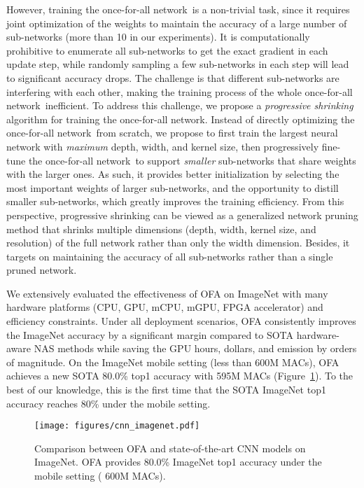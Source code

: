 \documentclass{article} \usepackage{iclr2020_conference,times}
\newcommand{\motherNet}{once-for-all network}
\begin{document}
However, training the \motherNet~is a non-trivial task, since it requires joint optimization of the weights to maintain the accuracy of a large number of sub-networks (more than 10 in our experiments). It is computationally prohibitive to enumerate all sub-networks to get the exact gradient in each update step, while randomly sampling a few sub-networks in each step will lead to significant accuracy drops. The challenge is that different sub-networks are interfering with each other, making the training process of the whole \motherNet~inefficient. 
To address this challenge, we propose a \textit{progressive shrinking} algorithm for training the \motherNet. Instead of directly optimizing the \motherNet~from scratch, we propose to first train the largest neural network with \emph{maximum} depth, width, and kernel size, then progressively fine-tune the \motherNet~to support \textit{smaller} sub-networks that share weights with the larger ones. As such, it provides better initialization by selecting the most important weights of larger sub-networks, and the opportunity to distill smaller sub-networks, which greatly improves the training efficiency. From this perspective, progressive shrinking can be viewed as a generalized network pruning method that shrinks multiple dimensions (depth, width, kernel size, and resolution) of the full network rather than only the width dimension. Besides, it targets on maintaining the accuracy of all sub-networks rather than a single pruned network. 

We extensively evaluated the effectiveness of OFA on ImageNet with many hardware platforms (CPU, GPU, mCPU, mGPU, FPGA accelerator) and efficiency constraints. Under all deployment scenarios, OFA consistently improves the ImageNet accuracy by a significant margin compared to SOTA hardware-aware NAS methods while saving the GPU hours, dollars, and  emission by orders of magnitude. On the ImageNet mobile setting (less than 600M MACs), OFA achieves a new SOTA 80.0\% top1 accuracy with 595M MACs (Figure~\ref{fig:cnn_imagenet}). To the best of our knowledge, this is the first time that the SOTA ImageNet top1 accuracy reaches 80\% under the mobile setting.

\begin{figure}[t]
    \vspace{-20pt}
    \centering
    \texttt{[image: figures/cnn\_imagenet.pdf]}
    \caption{Comparison between OFA and state-of-the-art CNN models on ImageNet. OFA provides 80.0\% ImageNet top1 accuracy under the mobile setting ( 600M MACs).}\label{fig:cnn_imagenet}
\end{figure}
 
\end{document}
